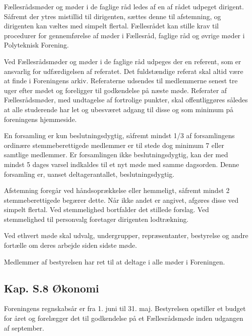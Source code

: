 \begin{list}
\item  Fællesrådsmøder og møder i de faglige råd ledes af en af rådet udpeget dirigent. Såfremt der ytres mistillid til dirigenten, sættes denne til afstemning, og dirigenten kan væltes med simpelt flertal. Fællesrådet kan stille krav til procedurer for gennemførelse af møder i Fællesråd, faglige råd og øvrige møder i Polyteknisk Forening.

\item  Ved Fællesrådsmøder og møder i de faglige råd udpeges der en referent, som er ansvarlig for udfærdigelsen af referatet. Det fuldstændige referat skal altid være at finde i Foreningens arkiv. Referaterne udsendes til medlemmerne senest tre uger efter mødet og foreligger til godkendelse på næste møde. Referater af Fællesrådsmøder, med undtagelse af fortrolige punkter, skal offentliggøres således at alle studerende har let og ubesværet adgang til disse og som minimum på foreningens hjemmeside.

\item  En forsamling er kun beslutningsdygtig, såfremt mindst 1/3 af forsamlingens ordinære stemmeberettigede medlemmer er til stede dog minimum 7 eller samtlige medlemmer. Er forsamlingen ikke beslutningsdygtig, kan der med mindst 5 dages varsel indkaldes til et nyt møde med samme dagsorden. Denne forsamling er, uanset deltagerantallet, beslutningsdygtig.

\item  Afstemning foregår ved håndsoprækkelse eller hemmeligt, såfremt mindst 2 stemmeberettigede begærer dette. Når ikke andet er angivet, afgøres disse ved simpelt flertal. Ved stemmelighed bortfalder det stillede forslag. Ved stemmelighed til personvalg foretager dirigenten lodtrækning.

\item  Ved ethvert møde skal udvalg, undergrupper, repræsentanter, bestyrelse og andre fortælle om deres arbejde siden sidste møde.

\item  Medlemmer af bestyrelsen har ret til at deltage i alle møder i Foreningen.


\subsection*{Kap. S.8 Økonomi}
\label{S:Kap:oekonomi}
\item  Foreningens regnskabsår er fra 1. juni til 31. maj. Bestyrelsen opstiller et budget for året og forelægger det til godkendelse på et Fællesrådsmøde inden udgangen af september.


\end{list}
